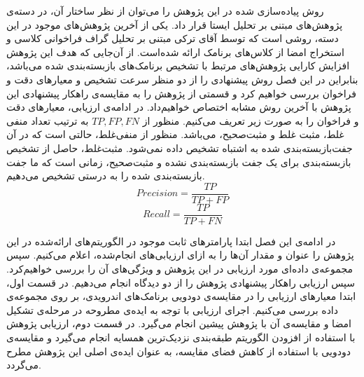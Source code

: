 
\label{result}
روش پیاده‌سازی شده در این پژوهش را می‌توان از نظر ساختار آن، در دسته‌ی پژوهش‌های مبتنی بر تحلیل ایستا قرار داد. یکی از آخرین پژوهش‌های موجود در این دسته، روشی است که توسط آقای ترکی مبتنی بر تحلیل گراف فراخوانی کلاسی و استخراج امضا از کلاس‌های برنامک ارائه شده‌است. از آن‌جایی که هدف این پژوهش افزایش کارایی پژوهش‌های مرتبط با تشخیص برنامک‌های بازبسته‌بندی شده می‌باشد، بنابراین در این فصل روش پیشنهادی را از دو منظر سرعت تشخیص و معیار‌های دقت و فراخوان بررسی خواهیم کرد و قسمتی از پژوهش را به مقایسه‌ی راهکار پیشنهادی این پژوهش با آخرین روش مشابه اختصاص خواهیم‌داد. در ادامه‌ی ارزیابی، معیار‌های دقت و فراخوان را به صورت زیر تعریف می‌کنیم. منظور از $TP,FP,FN$ به ترتیب تعداد منفی‌ غلط، مثبت غلط و مثبت‌صحیح، می‌باشد. منظور از منفی‌غلط، حالتی است که در آن جفت‌بازبسته‌بندی شده به اشتباه تشخیص داده‌ نمی‌شود. مثبت‌غلط، حاصل از تشخیص بازبسته‌بندی برای یک جفت بازبسته‌بندی نشده و مثبت‌صحیح، زمانی است که ما جفت بازبسته‌بندی شده را به درستی تشخیص می‌دهیم.
\begin{equation}
	‫‪Precision‬‬	= \frac{TP}{TP+FP}
\end{equation}
\begin{equation}
		Recall = \frac{TP}{TP+FN}
\end{equation}

در ادامه‌ی این فصل ابتدا پارامتر‌های ثابت موجود در الگوریتم‌های ارائه‌شده در این پژوهش را عنوان و مقدار آن‌ها را به ازا‌ی ارزیابی‌های انجام‌شده، اعلام می‌کنیم. سپس مجموعه‌‌ی داده‌ای مورد ارزیابی در این پژوهش و ویژگی‌های آن را بررسی خواهیم‌کرد. سپس ارزیابی راهکار پیشنهادی پژوهش را از دو دیدگاه انجام می‌دهیم. در قسمت اول، ابتدا معیار‌های ارزیابی را در مقایسه‌ی دودویی برنامک‌های اندرویدی، بر روی مجموعه‌ی داده بررسی می‌کنیم. اجرای ارزیابی با توجه به ایده‌ی مطروحه در مرحله‌ی تشکیل امضا و مقایسه‌ی آن با پژوهش پیشین انجام می‌گیرد. در قسمت دوم، ارزیابی پژوهش با استفاده از افزودن الگوریتم‌ طبقه‌بندی نزدیک‌ترین همسایه انجام می‌گیرد و مقایسه‌ی دودویی با استفاده از کاهش فضای مقایسه‌، به عنوان ایده‌ی اصلی این پژوهش مطرح می‌گردد.

